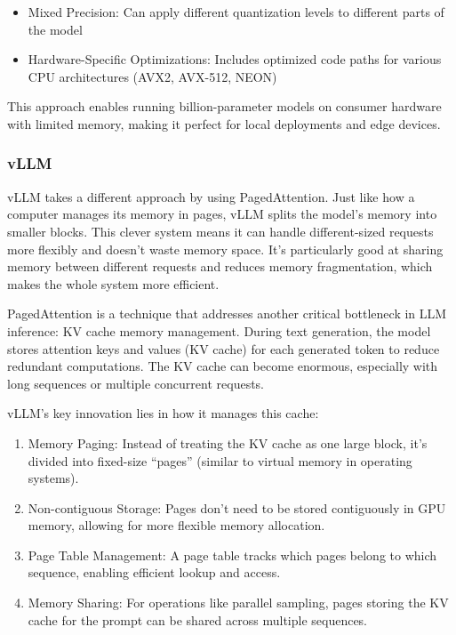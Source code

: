 \documentclass{article}
\begin{document}
\begin{itemize}
\item
  Mixed Precision: Can apply different quantization levels to different
  parts of the model
\item
  Hardware-Specific Optimizations: Includes optimized code paths for
  various CPU architectures (AVX2, AVX-512, NEON)
\end{itemize}

This approach enables running billion-parameter models on consumer
hardware with limited memory, making it perfect for local deployments
and edge devices.

\subsubsection{vLLM}\label{vllm}

vLLM takes a different approach by using PagedAttention. Just like how a
computer manages its memory in pages, vLLM splits the model's memory
into smaller blocks. This clever system means it can handle
different-sized requests more flexibly and doesn't waste memory space.
It's particularly good at sharing memory between different requests and
reduces memory fragmentation, which makes the whole system more
efficient.

PagedAttention is a technique that addresses another critical bottleneck
in LLM inference: KV cache memory management. During text generation,
the model stores attention keys and values (KV cache) for each generated
token to reduce redundant computations. The KV cache can become
enormous, especially with long sequences or multiple concurrent
requests.

vLLM's key innovation lies in how it manages this cache:

\begin{enumerate}
\def\labelenumi{\arabic{enumi}.}
\item
  Memory Paging: Instead of treating the KV cache as one large block,
  it's divided into fixed-size ``pages'' (similar to virtual memory in
  operating systems).
\item
  Non-contiguous Storage: Pages don't need to be stored contiguously in
  GPU memory, allowing for more flexible memory allocation.
\item
  Page Table Management: A page table tracks which pages belong to which
  sequence, enabling efficient lookup and access.
\item
  Memory Sharing: For operations like parallel sampling, pages storing
  the KV cache for the prompt can be shared across multiple sequences.
\end{enumerate}
\end{document}
